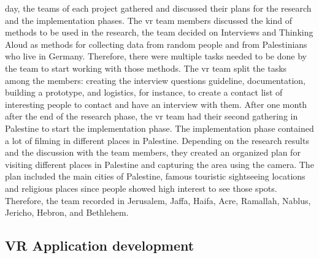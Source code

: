 day, the teams of each project gathered and discussed their plans for the research and the
implementation phases. The \acrshort{vr} team members discussed the kind of methods to be used in
the research, the team decided on Interviews and Thinking Aloud as methods for collecting
data from random people and from Palestinians who live in Germany. Therefore, there were
multiple tasks needed to be done by the team to start working with those methods. The \acrshort{vr}
team split the tasks among the members: creating the interview questions guideline,
documentation, building a prototype, and logistics, for instance, to create a contact list of
interesting people to contact and have an interview with them.
After one month after the end of the research phase, the \acrshort{vr} team had their second gathering
in Palestine to start the implementation phase. The implementation phase contained a lot of
filming in different places in Palestine. Depending on the research results and the discussion
with the team members, they created an organized plan for visiting different places in
Palestine and capturing the area using the camera. The plan included the main cities of
Palestine, famous touristic sightseeing locations and religious places since people showed
high interest to see those spots. Therefore, the team recorded in Jerusalem, Jaffa, Haifa, Acre, Ramallah, Nablus, Jericho, Hebron, and Bethlehem.

\subsection{VR Application development}

